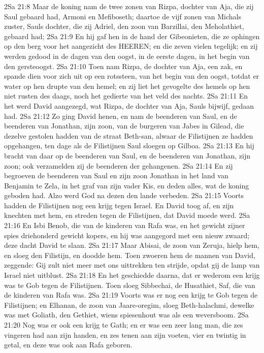 2Sa 21:8  Maar de koning nam de twee zonen van Rizpa, dochter van Aja, die zij Saul gebaard had, Armoni en Mefiboseth; daartoe de vijf zonen van Michals zuster, Sauls dochter, die zij Adriel, den zoon van Barzillai, den Meholathiet, gebaard had;
2Sa 21:9  En hij gaf hen in de hand der Gibeonieten, die ze ophingen op den berg voor het aangezicht des HEEREN; en die zeven vielen tegelijk; en zij werden gedood in de dagen van den oogst, in de eerste dagen, in het begin van den gersteoogst.
2Sa 21:10  Toen nam Rizpa, de dochter van Aja, een zak, en spande dien voor zich uit op een rotssteen, van het begin van den oogst, totdat er water op hen drupte van den hemel; en zij liet het gevogelte des hemels op hen niet rusten des daags, noch het gedierte van het veld des nachts.
2Sa 21:11  En het werd David aangezegd, wat Rizpa, de dochter van Aja, Sauls bijwijf, gedaan had.
2Sa 21:12  Zo ging David henen, en nam de beenderen van Saul, en de beenderen van Jonathan, zijn zoon, van de burgeren van Jabes in Gilead, die dezelve gestolen hadden van de straat Beth-san, alwaar de Filistijnen ze hadden opgehangen, ten dage als de Filistijnen Saul sloegen op Gilboa.
2Sa 21:13  En hij bracht van daar op de beenderen van Saul, en de beenderen van Jonathan, zijn zoon; ook verzamelden zij de beenderen der gehangenen.
2Sa 21:14  En zij begroeven de beenderen van Saul en zijn zoon Jonathan in het land van Benjamin te Zela, in het graf van zijn vader Kis, en deden alles, wat de koning geboden had. Alzo werd God na dezen den lande verbeden.
2Sa 21:15  Voorts hadden de Filistijnen nog een krijg tegen Israel. En David toog af, en zijn knechten met hem, en streden tegen de Filistijnen, dat David moede werd.
2Sa 21:16  En Isbi Benob, die van de kinderen van Rafa was, en het gewicht zijner spies driehonderd gewicht kopers, en hij was aangegord met een nieuw zwaard; deze dacht David te slaan.
2Sa 21:17  Maar Abisai, de zoon van Zeruja, hielp hem, en sloeg den Filistijn, en doodde hem. Toen zwoeren hem de mannen van David, zeggende: Gij zult niet meer met ons uittrekken ten strijde, opdat gij de lamp van Israel niet uitblust.
2Sa 21:18  En het geschiedde daarna, dat er wederom een krijg was te Gob tegen de Filistijnen. Toen sloeg Sibbechai, de Husathiet, Saf, die van de kinderen van Rafa was.
2Sa 21:19  Voorts was er nog een krijg te Gob tegen de Filistijnen; en Elhanan, de zoon van Jaare-oregim, sloeg Beth-halachmi, dewelke was met Goliath, den Gethiet, wiens spiesenhout was als een weversboom.
2Sa 21:20  Nog was er ook een krijg te Gath; en er was een zeer lang man, die zes vingeren had aan zijn handen, en zes tenen aan zijn voeten, vier en twintig in getal, en deze was ook aan Rafa geboren.
